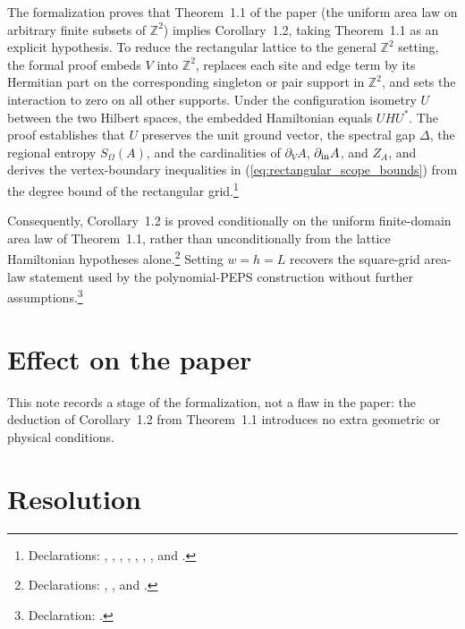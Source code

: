 \documentclass{article}
\begin{document}
The formalization proves that Theorem~1.1 of the paper (the uniform area law on
arbitrary finite subsets of $\mathbb Z^2$) implies Corollary~1.2, taking
Theorem~1.1 as an explicit hypothesis. To reduce the rectangular lattice to the
general $\mathbb Z^2$ setting, the formal proof embeds $V$ into $\mathbb Z^2$,
replaces each site and edge term by its Hermitian part on the corresponding
singleton or pair support in $\mathbb Z^2$, and sets the interaction to zero on
all other supports. Under the configuration isometry $U$ between the two
Hilbert spaces, the embedded Hamiltonian equals $UHU^*$. The proof establishes
that $U$ preserves the unit ground vector, the spectral gap $\Delta$, the
regional entropy $S_\Omega(A)$, and the cardinalities of $\partial_V A$,
$\partial_{\rm in}A$, and $Z_A$, and derives the vertex-boundary inequalities in
(\ref{eq:rectangular_scope_bounds}) from the degree bound of the rectangular
grid.\footnote{Declarations:
,
,
,
,
,
,
, and
.}

Consequently, Corollary~1.2 is proved conditionally on the uniform
finite-domain area law of Theorem~1.1, rather than unconditionally from the
lattice Hamiltonian hypotheses alone.\footnote{Declarations:
,
, and
.}
Setting $w=h=L$ recovers the square-grid area-law statement used by the
polynomial-PEPS construction without further assumptions.\footnote{Declaration:
.}

\section{Effect on the paper}

This note records a stage of the formalization, not a flaw in the paper: the
deduction of Corollary~1.2 from Theorem~1.1 introduces no extra geometric or
physical conditions.

\section{Resolution}
\end{document}
